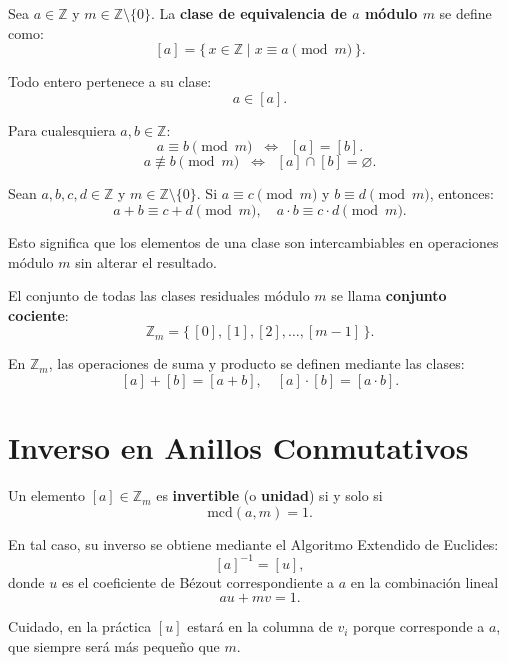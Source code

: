 \documentclass[a4paper,12pt]{article}
\begin{document}
\begin{procedimiento}[title={Definición de clase de equivalencia módulo \(m\)}]
Sea \(a \in \mathbb{Z}\) y \(m \in \mathbb{Z}\setminus\{0\}\).  
La \textbf{clase de equivalencia de \(a\) módulo \(m\)} se define como:
\[
[a] = \{\, x \in \mathbb{Z} \mid x \equiv a \pmod{m} \,\}.
\]
\end{procedimiento}

\begin{procedimiento}[title={Propiedad de pertenencia}]
Todo entero pertenece a su clase:
\[
a \in [a].
\]
\end{procedimiento}

\begin{procedimiento}[title={Clases equivalentes}]
Para cualesquiera \(a,b \in \mathbb{Z}\):
\[
a \equiv b \pmod{m} \;\;\Longleftrightarrow\;\; [a] = [b].
\]
\[
a \not\equiv b \pmod{m} \;\;\Longleftrightarrow\;\; [a] \cap [b] = \varnothing.
\]
\end{procedimiento}

\begin{procedimiento}[title={Compatibilidad con suma y producto}]
Sean \(a,b,c,d \in \mathbb{Z}\) y \(m \in \mathbb{Z}\setminus\{0\}\).  
Si \(a \equiv c \pmod{m}\) y \(b \equiv d \pmod{m}\), entonces:
\[
a + b \equiv c + d \pmod{m}, \quad a \cdot b \equiv c \cdot d \pmod{m}.
\]

Esto significa que los elementos de una clase son intercambiables en operaciones módulo \(m\) sin alterar el resultado.
\end{procedimiento}

\begin{procedimiento}[title={Conjunto cociente \(\mathbb{Z}_m\)}]

El conjunto de todas las clases residuales módulo \(m\) se llama \textbf{conjunto cociente}:
\[
\mathbb{Z}_m = \{\, [0], [1], [2], \dots, [m-1] \,\}.
\]

En \(\mathbb{Z}_m\), las operaciones de suma y producto se definen mediante las clases:
\[
[a] + [b] = [a+b], \quad [a] \cdot [b] = [a \cdot b].
\]
\end{procedimiento}

\section{Inverso en Anillos Conmutativos}

\begin{procedimiento}[title={Inverso en \(\mathbb{Z}_m\)}]
Un elemento \([a] \in \mathbb{Z}_m\) es \textbf{invertible} (o \textbf{unidad}) si y solo si
\[
\text{mcd}(a,m) = 1.
\]

En tal caso, su inverso se obtiene mediante el Algoritmo Extendido de Euclides:
\[
[a]^{-1} = [u],
\]
donde \(u\) es el coeficiente de Bézout correspondiente a \(a\) en la combinación lineal
\[
a u + m v = 1.
\]

Cuidado, en la práctica \([u]\) estará en la columna de \(v_i\) porque corresponde a \(a\), que siempre será más pequeño que \(m\).
\end{procedimiento}
\end{document}
